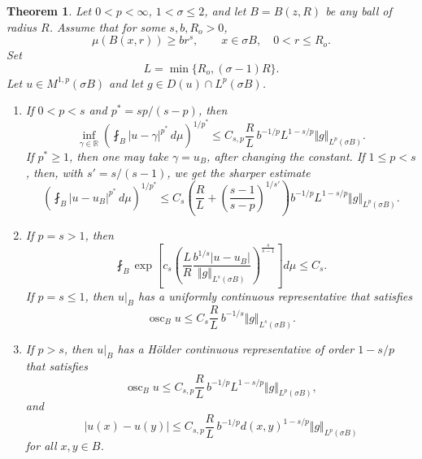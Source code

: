 \documentclass[10pt,a4paper]{amsart}
\newtheorem{theorem}{Theorem}
\newcommand{\bbbr}{\mathbb R}
\begin{document}
\begin{theorem}
\label{T2}
Let $0<p<\infty$, $1<\sigma\leq2$, and let $B=B(z,R)$ be any ball of radius $R$. Assume that for some $s,b,R_o>0$,
\begin{equation}
\label{eq20}
 \mu(B(x,r))\geq br^s,
 \qquad x\in\sigma B,\quad 0<r\leq R_o.
\end{equation}
Set
\[
 L=\min\{R_o,(\sigma-1)R\}.
\]
Let $u\in M^{1,p}(\sigma B)$ and let $g\in D(u)\cap L^p(\sigma B)$.
\begin{enumerate}
\item If $0<p<s$ and $p^*=sp/(s-p)$, then
\[
 \inf_{\gamma\in\bbbr}
 \left(\fint_B|u-\gamma|^{p^*}\,d\mu\right)^{1/p^*}
 \leq C_{s,p}\frac{R}{L}\,b^{-1/p}L^{1-s/p}
 \Vert g\Vert_{L^p(\sigma B)}.
\]
If $p^*\geq1$, then one may take $\gamma=u_B$, after changing the constant. If $1\leq p<s$, then, with $s'=s/(s-1)$, we get the sharper estimate
\begin{equation}
\label{eq54}
 \left(\fint_B|u-u_B|^{p^*}\,d\mu\right)^{1/p^*}
 \leq C_s\left(
 \frac{R}{L}+\left(\frac{s-1}{s-p}\right)^{1/s'}
 \right)b^{-1/p}L^{1-s/p}
 \Vert g\Vert_{L^p(\sigma B)}.
\end{equation}

\item If $p=s>1$, then
\[
 \fint_B
 \exp\!\left[
 c_s\left(
 \frac{L}{R}\frac{b^{1/s}|u-u_B|}
 {\Vert g\Vert_{L^s(\sigma B)}}
 \right)^{\frac{s}{s-1}}
 \right]d\mu
 \leq C_s.
\]
If $p=s\leq1$, then $u|_B$ has a  uniformly continuous representative that satisfies
\begin{equation}
\label{eq osc}
 \operatorname{osc}_B u
 \leq C_s\frac{R}{L}\,b^{-1/s}
 \Vert g\Vert_{L^s(\sigma B)}.
\end{equation}

\item If $p>s$, then $u|_B$ has a H\"older continuous representative of order $1-s/p$ that satisfies
\[
 \operatorname{osc}_B u
 \leq C_{s,p}\frac{R}{L}\,b^{-1/p}L^{1-s/p}
 \Vert g\Vert_{L^p(\sigma B)},
\]
and
\[
 |u(x)-u(y)|
 \leq C_{s,p}\frac{R}{L}\,b^{-1/p}d(x,y)^{1-s/p}
 \Vert g\Vert_{L^p(\sigma B)}
\]
for all $x,y\in B$.
\end{enumerate}
\end{theorem}
\end{document}
